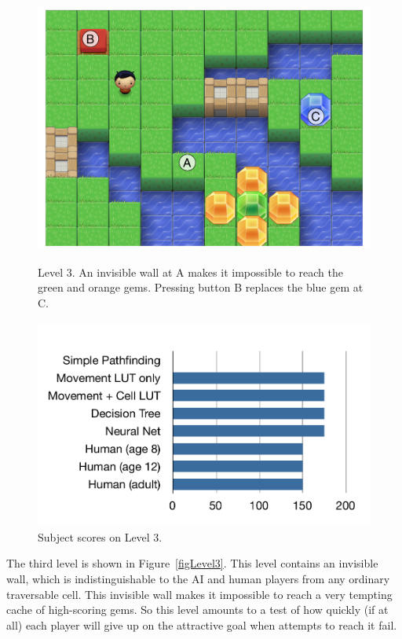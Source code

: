 \documentclass{article}
\begin{document}
\begin{figure}[ht]
\begin{minipage}[t]{0.45\linewidth}
\centering
\includegraphics[width=\textwidth]{figLevel3.pdf}
\caption{Level 3.  An invisible wall at A makes it impossible to reach the green and orange gems.  Pressing button B replaces the blue gem at C.}
\label{figLevel3}
\end{minipage}
\hspace{0.5cm}
\begin{minipage}[b]{0.45\linewidth}
\centering
\includegraphics[width=\textwidth]{figScores3.pdf}
\caption{Subject scores on Level 3.}
\label{figScores3}
\end{minipage}
\end{figure}

The third level is shown in Figure~\ref{figLevel3}. This level contains an invisible wall, which is indistinguishable to the AI and human players from any ordinary traversable cell.  This invisible wall makes it impossible to reach a very tempting cache of high-scoring gems.  So this level amounts to a test of how quickly (if at all) each player will give up on the attractive goal when attempts to reach it fail.
\end{document}
